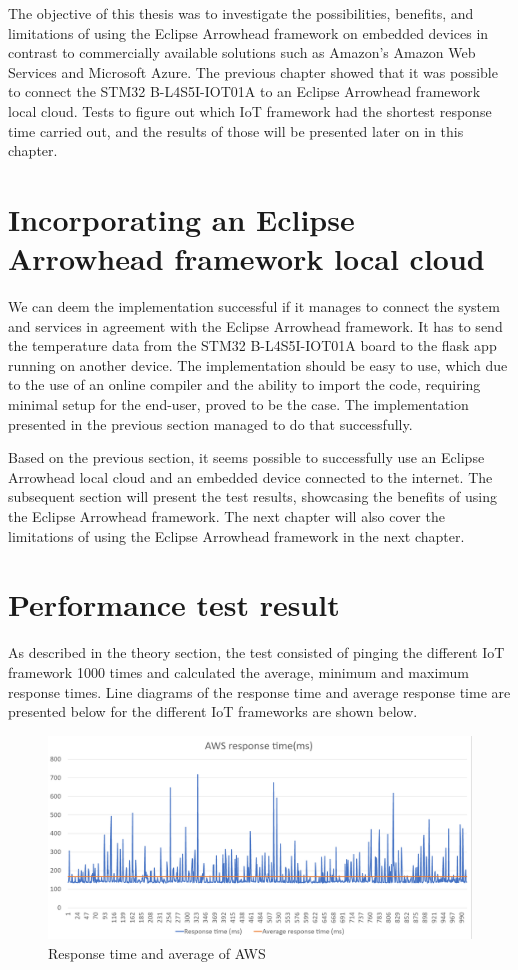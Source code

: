 The objective of this thesis was to investigate the possibilities, benefits, and limitations of using the Eclipse Arrowhead framework on embedded devices in contrast to commercially available solutions such
as Amazon's Amazon Web Services and Microsoft Azure. 
The previous chapter showed that it was possible to connect the STM32 B-L4S5I-IOT01A to an Eclipse Arrowhead framework local cloud.
Tests to figure out which IoT framework had the shortest response time carried out, and the results of those will be presented later on in this chapter.

\section{Incorporating an Eclipse Arrowhead framework local cloud}
We can deem the implementation successful if it manages to connect the system and services in agreement with the Eclipse Arrowhead framework.
It has to send the temperature data from the STM32 B-L4S5I-IOT01A board to the flask app running on another device.
The implementation should be easy to use, which due to the use of an online compiler and the ability to import the code, requiring minimal setup for the end-user, proved to be the case.  
The implementation presented in the previous section managed to do that successfully.

Based on the previous section, it seems possible to successfully use an Eclipse Arrowhead local cloud and an embedded device connected to the internet. 
The subsequent section will present the test results, showcasing the benefits of using the Eclipse Arrowhead framework.
The next chapter will also cover the limitations of using the Eclipse Arrowhead framework in the next chapter.

\section{Performance test result}
As described in the theory section, the test consisted of pinging the different IoT framework 1000 times and calculated the average, minimum and maximum response times. 
Line diagrams of the response time and average response time are presented below for the different IoT frameworks are shown below.
\begin{figure}[h!]
    \centering
    \includegraphics[width=\textwidth]{Pictures/AWS_response_time.png} 
    \caption{Response time and average of AWS}
    \label{AWS response time}
\end{figure}

